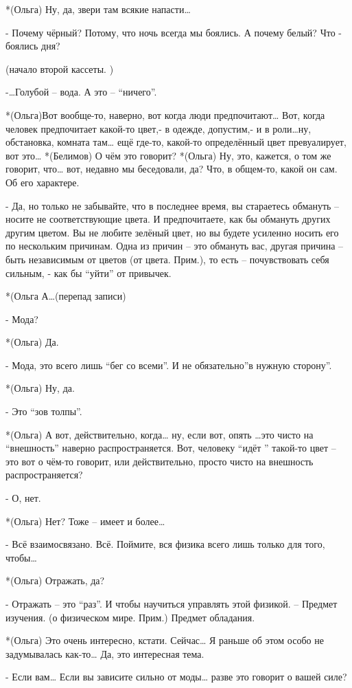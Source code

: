 *(Ольга) Ну, да, звери там всякие напасти…

- Почему чёрный? Потому, что ночь всегда мы боялись. А почему белый? Что - боялись дня?

(начало второй кассеты. )

-…Голубой – вода. А это – “ничего”.

*(Ольга)Вот вообще-то, наверно, вот когда люди предпочитают… Вот, когда человек предпочитает какой-то цвет,- в одежде, допустим,- и в роли…ну, обстановка, комната там… ещё где-то, какой-то определённый цвет превуалирует, вот это…
*(Белимов) О чём это говорит?
*(Ольга) Ну, это, кажется, о том же говорит, что… вот, недавно мы беседовали, да? Что, в общем-то, какой он сам. Об его характере.

- Да, но только не забывайте, что в последнее время, вы стараетесь обмануть – носите не соответствующие цвета. И предпочитаете, как бы обмануть других другим цветом. Вы не любите зелёный цвет, но вы будете усиленно носить его по нескольким причинам. Одна из причин – это обмануть вас, другая причина – быть независимым от цветов (от цвета. Прим.), то есть – почувствовать себя сильным, - как бы “уйти” от привычек. 

*(Ольга А…(перепад записи)

- Мода? 

*(Ольга) Да.

- Мода, это всего лишь “бег со всеми”. И не обязательно”в нужную сторону”.

*(Ольга) Ну, да.

- Это “зов толпы”.

*(Ольга) А вот, действительно, когда… ну, если вот, опять …это чисто на “внешность” наверно распространяется. Вот, человеку “идёт ” такой-то цвет – это вот о чём-то говорит, или действительно, просто чисто на внешность распространяется?

- О, нет.

*(Ольга) Нет? Тоже – имеет и более… 

- Всё взаимосвязано. Всё. Поймите, вся физика всего лишь только для того, чтобы…

*(Ольга) Отражать, да?

- Отражать – это “раз”. И чтобы научиться управлять этой физикой. – Предмет изучения. (о физическом мире. Прим.) Предмет обладания.

*(Ольга) Это очень интересно, кстати. Сейчас… Я раньше об этом особо не задумывалась как-то… Да, это интересная тема.

- Если вам… Если вы зависите сильно от моды… разве это говорит о вашей силе?

